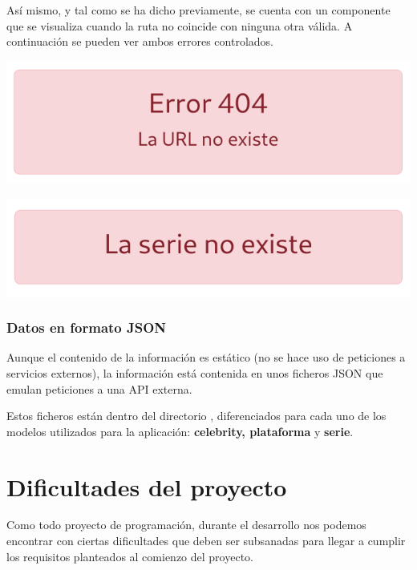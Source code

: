 \documentclass{\ClassPath/viu-tfm-template}
\begin{document}
Así mismo, y tal como se ha dicho previamente, se cuenta con un componente que se visualiza cuando la ruta no coincide con ninguna otra válida. A continuación se pueden ver ambos errores controlados.

{
    \hfill
    \begin{minipage}{0.4\linewidth}
        \includegraphics[width=\linewidth]{img/error1.png}
    \end{minipage}
    \hfill
    \begin{minipage}{0.4\linewidth}
        \includegraphics[width=\linewidth]{img/error2.png}
    \end{minipage}
    \hfill
}


\subsection{Datos en formato JSON}
Aunque el contenido de la información es estático (no se hace uso de peticiones a servicios externos), la información está contenida en unos ficheros JSON que emulan peticiones a una API externa.

Estos ficheros están dentro del directorio , diferenciados para cada uno de los modelos utilizados para la aplicación: \textbf{celebrity, plataforma} y \textbf{serie}.


\chapter{Dificultades del proyecto}

Como todo proyecto de programación, durante el desarrollo nos podemos encontrar con ciertas dificultades que deben ser subsanadas para llegar a cumplir los requisitos planteados al comienzo del proyecto.
\end{document}

